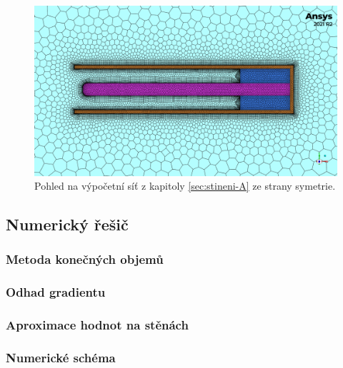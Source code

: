         \begin{figure}
            \centering
            \includegraphics[width=\textwidth]{300_VYPOCETNI_MODEL/mesh_sym_odvetrani_A.png}
            \caption{Pohled na výpočetní síť z kapitoly \ref{sec:stineni-A} ze strany symetrie.}
            \label{fig:sit-detail-stineni-A}
        \end{figure}
        
    \subsection{Numerický řešič}
        \subsubsection{Metoda konečných objemů}
        \subsubsection{Odhad gradientu}
        \subsubsection{Aproximace hodnot na stěnách}
        \subsubsection{Numerické schéma}

        
        